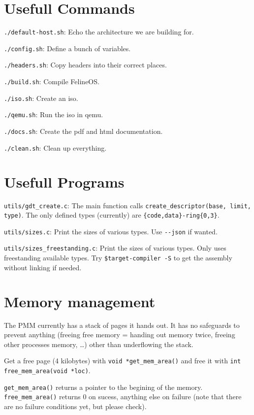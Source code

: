 \documentclass[12pt]{article}
\newcommand{\code}[1]{\colorbox{light-gray}{\texttt{#1}}}
\begin{document}
\section{Usefull Commands}
\begin{list}{}{}
\item \code{./default-host.sh}: Echo the architecture we are building for.
\item \code{./config.sh}: Define a bunch of variables.
\item \code{./headers.sh}: Copy headers into their correct places.
\item \code{./build.sh}: Compile FelineOS.\@
\item \code{./iso.sh}: Create an iso.
\item \code{./qemu.sh}: Run the iso in qemu.
\item \code{./docs.sh}: Create the pdf and html documentation.
\item \code{./clean.sh}: Clean up everything.
\end{list}

\section{Usefull Programs}
\begin{list}{}{}
\item \code{utils/gdt\_create.c}: The main function calls \code{create\_descriptor(base, limit, type)}. The only defined types (currently) are \code{\{code,data\}-ring\{0,3\}}.
\item \code{utils/sizes.c}: Print the sizes of various types. Use \code{-{}-json} if wanted.
\item \code{utils/sizes\_freestanding.c}: Print the sizes of various types. Only uses freestanding available types. Try \code{\$target-compiler -S} to get the assembly without linking if needed.
\end{list}

\section{Memory management}
\begin{list}{}{}
\item The PMM currently has a stack of pages it hands out. It has no safeguards to prevent anything (freeing free memory = handing out memory twice, freeing other processes memory, \ldots) other than underflowing the stack.
\item Get a free page (4 kilobytes) with \code{void *get\_mem\_area()} and free it with \code{int free\_mem\_area(void *loc)}.
\item \code{get\_mem\_area()} returns a pointer to the begining of the memory. \code{free\_mem\_area()} returns 0 on sucess, anything else on failure (note that there are no failure conditions yet, but please check).
\end{list}
\end{document}
